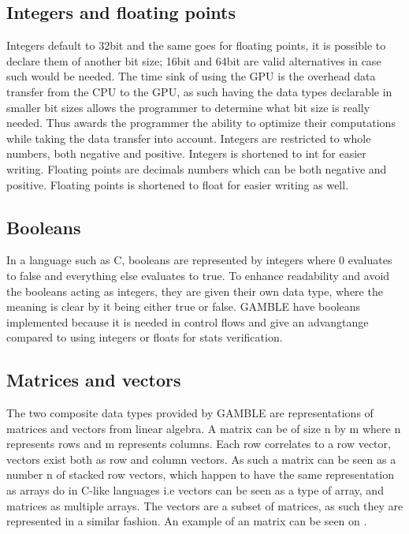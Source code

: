 \subsection{Integers and floating points}
Integers default to 32bit and the same goes for floating points, it is possible to declare them of another bit size; 16bit and 64bit are valid alternatives in case such would be needed.%
The time sink of using the GPU is the overhead data transfer from the CPU to the GPU, as such having the data types declarable in smaller bit sizes allows the programmer to determine what bit size is really needed.
Thus awards the programmer the ability to optimize their computations while taking the data transfer into account.
Integers are restricted to whole numbers, both negative and positive.
Integers is shortened to int for easier writing.
Floating points are decimals numbers which can be both negative and positive.
Floating points is shortened to float for easier writing as well.

\subsection{Booleans}
In a language such as C, booleans are represented by integers where 0 evaluates to false and everything else evaluates to true.
To enhance readability and avoid the booleans acting as integers, they are given their own data type, where the meaning is clear by it being either true or false.
GAMBLE have booleans implemented because it is needed in control flows and give an advangtange compared to using integers or floats for stats verification.   

\subsection{Matrices and vectors}
The two composite data types provided by GAMBLE are representations of matrices and vectors from linear algebra.
A matrix can be of size n by m where n represents rows and m represents columns.
Each row correlates to a row vector, vectors exist both as row and column vectors.
As such a matrix can be seen as a number n of stacked row vectors, which happen to have the same representation as arrays do in C-like languages i.e vectors can be seen as a type of array, and matrices as multiple arrays.
The vectors are a subset of matrices, as such they are represented in a similar fashion.
An example of an matrix can be seen on .


